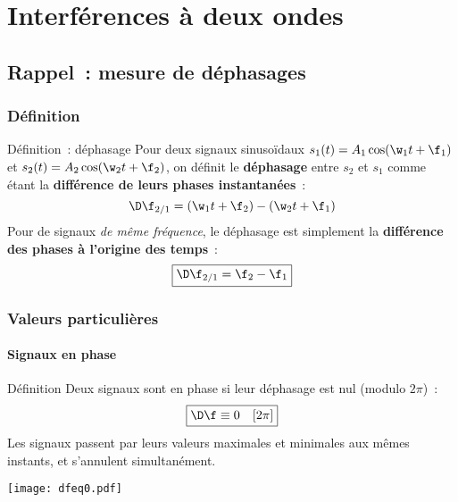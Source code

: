 \documentclass[../main/main.tex]{subfiles}
\begin{document}
\setcounter{chapter}{1}

\chapter{Interf\'erences \`a deux ondes}

\section{Rappel~: mesure de déphasages}
\subsection{Définition}
\begin{NCdefi}[width=\linewidth]{Définition~: déphasage}
    Pour deux signaux sinusoïdaux $s_1(t) = A_1\cos(\w_1t+\f_1)$ et $s_2(t) =
    A_2\cos(\w_2t+\f_2)$, on définit le \textbf{déphasage} entre $s_2$ et $s_1$
    comme étant la \textbf{différence de leurs phases instantanées}~:
    \[\D\f_{2/1} = (\w_1t + \f_2) - (\w_2t+\f_1)\]
    Pour de signaux \textit{de même fréquence}, le déphasage est simplement la
    \textbf{différence des phases à l'origine des temps}~:
    \[\boxed{\D\f_{2/1} = \f_2 - \f_1}\]
\end{NCdefi}

\vspace{-10pt}
\subsection{Valeurs particulières}
\subsubsection{Signaux en phase}
\vspace{-20pt}
\begin{minipage}{0.70\linewidth}
    \begin{rdefi}{\small Définition}
        Deux signaux sont en phase si leur déphasage est nul (modulo $2\pi$)~:
        \[\boxed{\D\f \equiv 0\quad[2\pi]}\]
        Les signaux passent par leurs valeurs maximales et minimales aux mêmes
        instants, et s'annulent simultanément.
    \end{rdefi}
\end{minipage}
\hfill
\begin{minipage}{0.30\linewidth}
    \begin{center}
        \texttt{[image: dfeq0.pdf]}
    \end{center}
\end{minipage}
\end{document}

